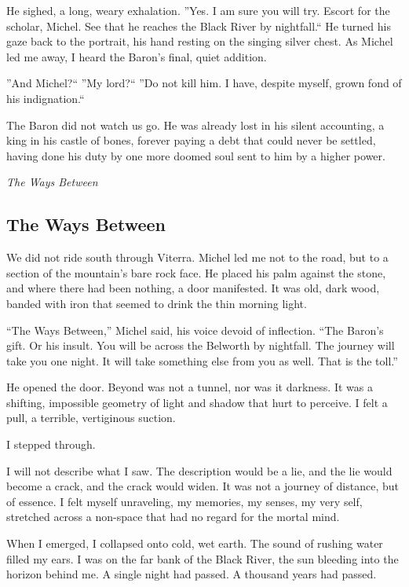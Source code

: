 \documentclass[11pt]{article}
\begin{document}
He sighed, a long, weary exhalation. ''Yes. I am sure you will try. Escort for the scholar, Michel. See that he reaches the Black River by nightfall.`` He turned his gaze back to the portrait, his hand resting on the singing silver chest. As Michel led me away, I heard the Baron's final, quiet addition.

''And Michel?``
''My lord?``
''Do not kill him. I have, despite myself, grown fond of his indignation.``

The Baron did not watch us go. He was already lost in his silent accounting, a king in his castle of bones, forever paying a debt that could never be settled, having done his duty by one more doomed soul sent to him by a higher power.


\vspace{1em}
\noindent
\textit{The Ways Between}

\subsection*{The Ways Between}

We did not ride south through Viterra. Michel led me not to the road, but to a section of the mountain's bare rock face. He placed his palm against the stone, and where there had been nothing, a door manifested. It was old, dark wood, banded with iron that seemed to drink the thin morning light.

``The Ways Between,'' Michel said, his voice devoid of inflection. ``The Baron's gift. Or his insult. You will be across the Belworth by nightfall. The journey will take you one night. It will take something else from you as well. That is the toll.''

He opened the door. Beyond was not a tunnel, nor was it darkness. It was a shifting, impossible geometry of light and shadow that hurt to perceive. I felt a pull, a terrible, vertiginous suction.

I stepped through.

I will not describe what I saw. The description would be a lie, and the lie would become a crack, and the crack would widen. It was not a journey of distance, but of essence. I felt myself unraveling, my memories, my senses, my very self, stretched across a non-space that had no regard for the mortal mind.

When I emerged, I collapsed onto cold, wet earth. The sound of rushing water filled my ears. I was on the far bank of the Black River, the sun bleeding into the horizon behind me. A single night had passed. A thousand years had passed.
\end{document}
